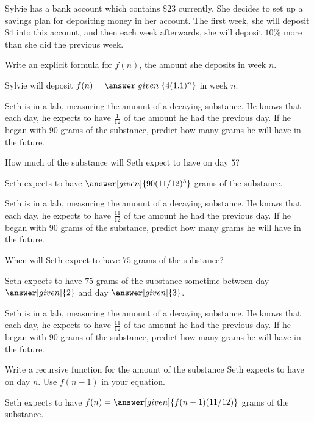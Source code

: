 \documentclass[nooutcomes]{ximera}
\begin{document}
\begin{problem}
Sylvie has a bank account which contains $\$23$ currently.  She decides to set up a savings plan for depositing money in her account.  The first week, she will deposit $\$4$ into this account, and then each week afterwards, she will deposit $10\%$ more than she did the previous week.  

Write an explicit formula for $f(n)$, the amount she deposits in week $n$.

\begin{prompt}
Sylvie will deposit $f(n) = \answer[given]{4(1.1)^n}$ in week $n$.
\end{prompt}

\end{problem}




\begin{problem}
Seth is in a lab, measuring the amount of a decaying substance.  He knows that each day, he expects to have $\frac{1}{12}$ of the amount he had the previous day.  If he began with $90$ grams of the substance, predict how many grams he will have in the future.

How much of the substance will Seth expect to have on day $5$?
\begin{prompt}
Seth expects to have $\answer[given]{90(11/12)^{5}}$ grams of the substance.
\end{prompt}

\end{problem}



\begin{problem}
Seth is in a lab, measuring the amount of a decaying substance.  He knows that each day, he expects to have $\frac{11}{12}$ of the amount he had the previous day.  If he began with $90$ grams of the substance, predict how many grams he will have in the future.

When will Seth expect to have $75$ grams of the substance?
\begin{prompt}
Seth expects to have $75$ grams of the substance sometime between day $\answer[given]{2}$ and day $\answer[given]{3}$.
\end{prompt}

\end{problem}




\begin{problem}
Seth is in a lab, measuring the amount of a decaying substance.  He knows that each day, he expects to have $\frac{11}{12}$ of the amount he had the previous day.  If he began with $90$ grams of the substance, predict how many grams he will have in the future.

Write a recursive function for the amount of the substance Seth expects to have on day $n$.  Use $f(n-1)$ in your equation.
\begin{prompt}
Seth expects to have $f(n) = \answer[given]{f(n-1)(11/12)}$ grams of the substance.
\end{prompt}

\end{problem}
\end{document}
